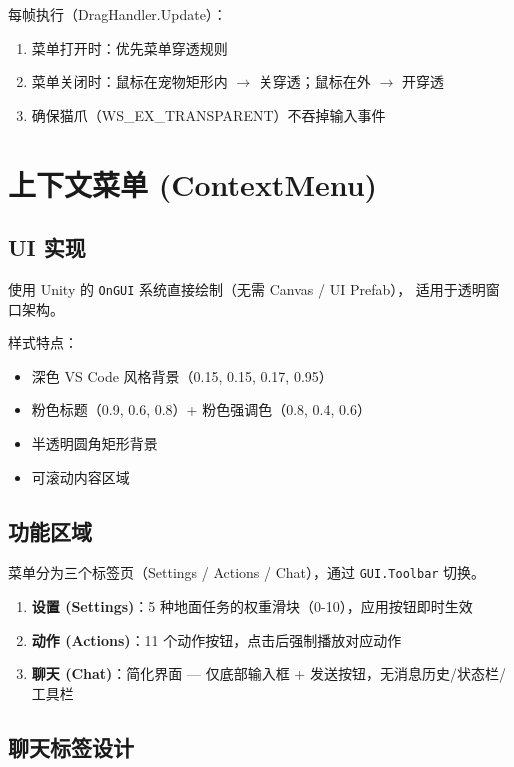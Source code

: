 \documentclass[12pt,a4paper]{ctexart}
\begin{document}
每帧执行（DragHandler.Update）：
\begin{enumerate}
    \item 菜单打开时：优先菜单穿透规则
    \item 菜单关闭时：鼠标在宠物矩形内 $\to$ 关穿透；鼠标在外 $\to$ 开穿透
    \item 确保猫爪（WS\_EX\_TRANSPARENT）不吞掉输入事件
\end{enumerate}

\section{上下文菜单 (ContextMenu)}

\subsection{UI 实现}

使用 Unity 的 \texttt{OnGUI} 系统直接绘制（无需 Canvas / UI Prefab），
适用于透明窗口架构。

样式特点：
\begin{itemize}
    \item 深色 VS Code 风格背景（0.15, 0.15, 0.17, 0.95）
    \item 粉色标题（0.9, 0.6, 0.8）+ 粉色强调色（0.8, 0.4, 0.6）
    \item 半透明圆角矩形背景
    \item 可滚动内容区域
\end{itemize}

\subsection{功能区域}

菜单分为三个标签页（Settings / Actions / Chat），通过 \texttt{GUI.Toolbar} 切换。

\begin{enumerate}
    \item \textbf{设置 (Settings)}：5 种地面任务的权重滑块（0-10），应用按钮即时生效
    \item \textbf{动作 (Actions)}：11 个动作按钮，点击后强制播放对应动作
    \item \textbf{聊天 (Chat)}：简化界面 — 仅底部输入框 + 发送按钮，无消息历史/状态栏/工具栏
\end{enumerate}

\subsection{聊天标签设计}
\end{document}
